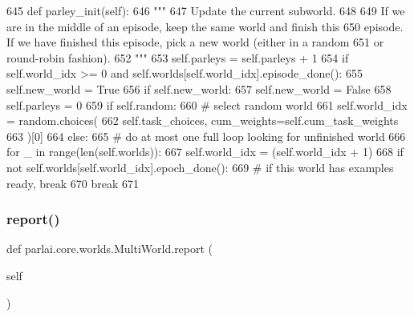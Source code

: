 \begin{DoxyCode}
645     \textcolor{keyword}{def }parley\_init(self):
646         \textcolor{stringliteral}{"""}
647 \textcolor{stringliteral}{        Update the current subworld.}
648 \textcolor{stringliteral}{}
649 \textcolor{stringliteral}{        If we are in the middle of an episode, keep the same world and finish this}
650 \textcolor{stringliteral}{        episode. If we have finished this episode, pick a new world (either in a random}
651 \textcolor{stringliteral}{        or round-robin fashion).}
652 \textcolor{stringliteral}{        """}
653         self.parleys = self.parleys + 1
654         \textcolor{keywordflow}{if} self.world\_idx >= 0 \textcolor{keywordflow}{and} self.worlds[self.world\_idx].episode\_done():
655             self.new\_world = \textcolor{keyword}{True}
656         \textcolor{keywordflow}{if} self.new\_world:
657             self.new\_world = \textcolor{keyword}{False}
658             self.parleys = 0
659             \textcolor{keywordflow}{if} self.random:
660                 \textcolor{comment}{# select random world}
661                 self.world\_idx = random.choices(
662                     self.task\_choices, cum\_weights=self.cum\_task\_weights
663                 )[0]
664             \textcolor{keywordflow}{else}:
665                 \textcolor{comment}{# do at most one full loop looking for unfinished world}
666                 \textcolor{keywordflow}{for} \_ \textcolor{keywordflow}{in} range(len(self.worlds)):
667                     self.world\_idx = (self.world\_idx + 1) %
668                     \textcolor{keywordflow}{if} \textcolor{keywordflow}{not} self.worlds[self.world\_idx].epoch\_done():
669                         \textcolor{comment}{# if this world has examples ready, break}
670                         \textcolor{keywordflow}{break}
671 
\end{DoxyCode}
\mbox{\label{classparlai_1_1core_1_1worlds_1_1MultiWorld_aa89365baa3672e08d8e239199df4eda7}} 
\subsubsection{\texorpdfstring{report()}{report()}}
{\footnotesize\ttfamily def parlai.\+core.\+worlds.\+Multi\+World.\+report (\begin{DoxyParamCaption}\item[{}]{self }\end{DoxyParamCaption})}

